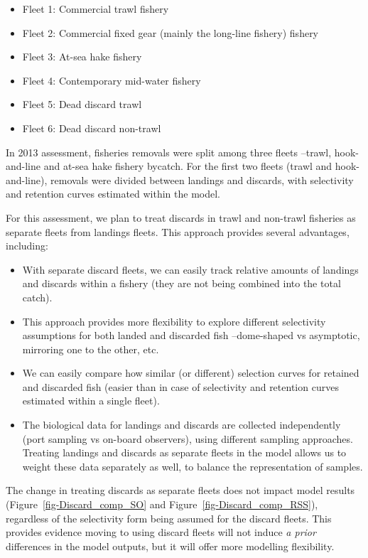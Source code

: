 \documentclass[
]{scrartcl}
\providecommand{\tightlist}{%
  \setlength{\itemsep}{0pt}\setlength{\parskip}{0pt}}\usepackage{longtable,booktabs,array}
\begin{document}
\begin{itemize}
\tightlist
\item
  Fleet 1: Commercial trawl fishery
\item
  Fleet 2: Commercial fixed gear (mainly the long-line fishery) fishery
\item
  Fleet 3: At-sea hake fishery
\item
  Fleet 4: Contemporary mid-water fishery
\item
  Fleet 5: Dead discard trawl
\item
  Fleet 6: Dead discard non-trawl
\end{itemize}

In 2013 assessment, fisheries removals were split among three fleets
--trawl, hook-and-line and at-sea hake fishery bycatch. For the first
two fleets (trawl and hook-and-line), removals were divided between
landings and discards, with selectivity and retention curves estimated
within the model.

For this assessment, we plan to treat discards in trawl and non-trawl
fisheries as separate fleets from landings fleets. This approach
provides several advantages, including:

\begin{itemize}
\tightlist
\item
  With separate discard fleets, we can easily track relative amounts of
  landings and discards within a fishery (they are not being combined
  into the total catch).
\item
  This approach provides more flexibility to explore different
  selectivity assumptions for both landed and discarded fish
  --dome-shaped vs asymptotic, mirroring one to the other, etc.
\item
  We can easily compare how similar (or different) selection curves for
  retained and discarded fish (easier than in case of selectivity and
  retention curves estimated within a single fleet).
\item
  The biological data for landings and discards are collected
  independently (port sampling vs on-board observers), using different
  sampling approaches. Treating landings and discards as separate fleets
  in the model allows us to weight these data separately as well, to
  balance the representation of samples.
\end{itemize}

The change in treating discards as separate fleets does not impact model
results (Figure~\ref{fig-Discard_comp_SO} and
Figure~\ref{fig-Discard_comp_RSS}), regardless of the selectivity form
being assumed for the discard fleets. This provides evidence moving to
using discard fleets will not induce \emph{a prior} differences in the
model outputs, but it will offer more modelling flexibility.
\end{document}

